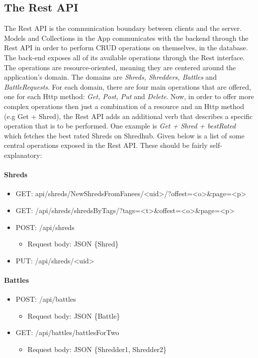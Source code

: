 \subsection{The Rest API}
The Rest API is the communication boundary between clients and the server. Models and Collections in the App communicates with the backend through the Rest API in order to perform CRUD operations on themselves, in the database. The back-end exposes all of its available operations through the Rest interface. The operations are resource-oriented, meaning they are centered around the application's domain. The domains are \textit{Shreds, Shredders, Battles} and \textit{BattleRequests}. For each domain, there are four main operations that are offered, one for each Http method: \textit{Get, Post, Put} and \textit{Delete}. Now, in order to offer more complex operations then just a combination of a resource and an Http method (e.g Get + Shred), the Rest API adds an additional verb that describes a specific operation that is to be performed. One example is \textit{Get + Shred + bestRated} which fetches the best rated Shreds on Shredhub. Given below is a list of some central operations exposed in the Rest API. These should be fairly self-explanatory:

\paragraph{Shreds}
\begin{itemize}
\item{} GET: api/shreds/NewShredsFromFanees/<uid>/?offest=<o>\&page=<p>
\item{} GET: /api/shreds/shredsByTags/?tags=<t>\&offest=<o>\&page=<p>
\item{} POST: /api/shreds 
	\begin{itemize}
	\item{} Request body: JSON \{Shred\}
	\end{itemize}
\item{} PUT: /api/shreds/<uid>
\end{itemize}

\paragraph{Battles}
\begin{itemize}
\item{}POST: /api/battles
	\begin{itemize}
	\item{} Request body: JSON \{Battle\}
	\end{itemize}
\item{}GET: /api/battles/battlesForTwo
	\begin{itemize}
	\item{} Request body: JSON \{Shredder1, Shredder2\}
	\end{itemize}
\end{itemize}

